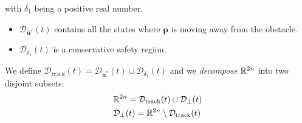 \documentclass[10pt, a4paper]{report}
\begin{document}
with $\delta_1$ being a positive real number.\begin{itemize}
    \item $\mathcal D_{\mathbf u^*}(t)$ contains all the states where $\mathbf p$ is moving away from the obstacle.
    \item $ \mathcal D_{\delta_1}(t)$ is a conservative safety region.
\end{itemize}
We define $\mathcal D_{\text{track}}(t)=\mathcal D_{\mathbf u^*}(t)\cup  \mathcal D_{\delta_1}(t)$ and we \textit{decompose} ${\mathbb R}^{2n}$ into two disjoint subsets:\begin{align}
    &{\mathbb R}^{2n}=\mathcal D_{\text{track}}(t)\cup \mathcal D_\bot(t)\\ 
&\mathcal D_\bot(t)={\mathbb R}^{2n} \setminus \mathcal D_{\text{track}}(t)
\end{align}
\end{document}
